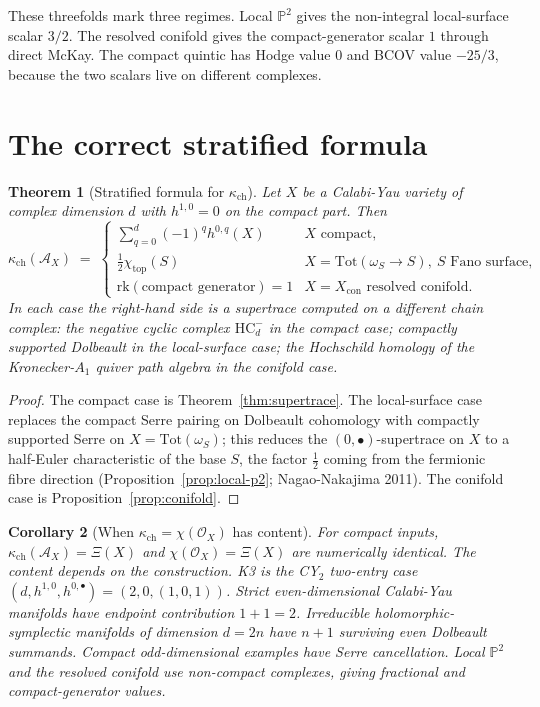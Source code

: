 \documentclass[11pt]{article}
\newtheorem{theorem}{Theorem}[section]
\newtheorem{corollary}[theorem]{Corollary}
\providecommand{\cA}{\mathcal{A}}
\providecommand{\cO}{\mathcal{O}}
\providecommand{\HC}{\mathrm{HC}}
\providecommand{\Tot}{\mathrm{Tot}}
\providecommand{\rk}{\mathrm{rk}}
\begin{document}
These threefolds mark three regimes. Local $\mathbb{P}^2$ gives the
non-integral local-surface scalar $3/2$. The resolved conifold gives
the compact-generator scalar $1$ through direct McKay. The compact
quintic has Hodge value \(0\) and BCOV value \(-25/3\), because the two
scalars live on different complexes.

\section{The correct stratified formula}
\label{sec:correct-formula}

\begin{theorem}[Stratified formula for $\kappa_{\mathrm{ch}}$]
\label{thm:stratified}
Let $X$ be a Calabi-Yau variety of complex dimension $d$ with
$h^{1,0}=0$ on the compact part. Then
\[
   \kappa_{\mathrm{ch}}(\cA_X)\;=\;\begin{cases}
   \displaystyle\sum_{q=0}^{d}(-1)^{q}h^{0,q}(X) & X\text{ compact},\\[4pt]
   \tfrac{1}{2}\chi_{\mathrm{top}}(S) & X=\Tot(\omega_{S}\to S),\ S\text{ Fano surface},\\[4pt]
   \rk(\text{compact generator})=1 & X=X_{\mathrm{con}}\text{ resolved conifold}.
   \end{cases}
\]
In each case the right-hand side is a supertrace computed on a different
chain complex: the negative cyclic complex $\HC^{-}_{d}$ in the compact
case; compactly supported Dolbeault in the local-surface case; the
Hochschild homology of the Kronecker-$A_{1}$ quiver path algebra in the
conifold case.
\end{theorem}

\begin{proof}
The compact case is Theorem~\ref{thm:supertrace}. The local-surface
case replaces the compact Serre pairing on Dolbeault cohomology with
compactly supported Serre on $X=\Tot(\omega_{S})$; this reduces the
$(0,\bullet)$-supertrace on $X$ to a half-Euler characteristic of the
base $S$, the factor $\tfrac12$ coming from the fermionic fibre
direction (Proposition~\ref{prop:local-p2}; Nagao-Nakajima 2011). The
conifold case is Proposition~\ref{prop:conifold}.
\end{proof}

\begin{corollary}[When $\kappa_{\mathrm{ch}}=\chi(\cO_X)$ has content]
\label{cor:identity-scope}
For compact inputs, $\kappa_{\mathrm{ch}}(\cA_X)=\Xi(X)$ and
\(\chi(\cO_X)=\Xi(X)\) are numerically identical. The content depends on
the construction. K3 is the CY$_2$ two-entry case
$(d,h^{1,0},h^{0,\bullet})=(2,0,(1,0,1))$. Strict even-dimensional
Calabi-Yau manifolds have endpoint contribution \(1+1=2\). Irreducible
holomorphic-symplectic manifolds of dimension \(d=2n\) have
\(n+1\) surviving even Dolbeault summands. Compact odd-dimensional
examples have Serre cancellation. Local \(\mathbb P^2\) and the
resolved conifold use non-compact complexes, giving fractional and
compact-generator values.
\end{corollary}
\end{document}
